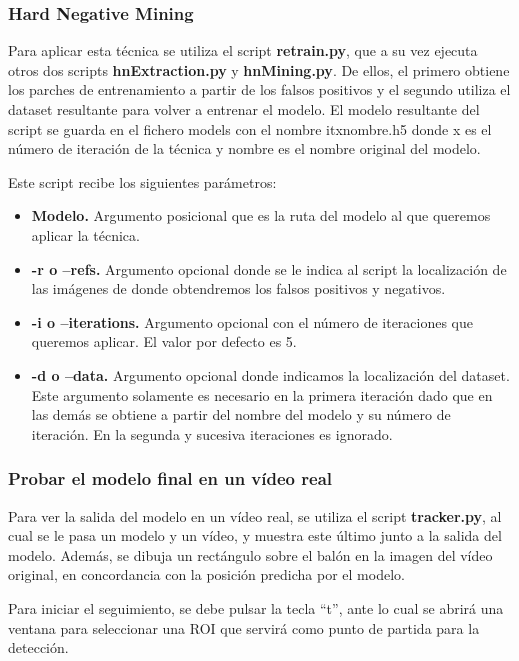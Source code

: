 \subsubsection*{Hard Negative Mining}

Para aplicar esta técnica se utiliza el script \textbf{retrain.py}, que a su vez ejecuta otros dos scripts \textbf{hnExtraction.py} y \textbf{hnMining.py}. De ellos, el primero obtiene los parches de entrenamiento a partir de los falsos positivos y el segundo utiliza el dataset resultante para volver a entrenar el modelo. El modelo resultante del script se guarda en el fichero models con el nombre itxnombre.h5 donde x es el número de iteración de la técnica y nombre es el nombre original del modelo.

Este script recibe los siguientes parámetros:

\begin{itemize}
  \item \textbf{Modelo.} Argumento posicional que es la ruta del modelo al que queremos aplicar la técnica.
  \item\textbf{-r o --refs.} Argumento opcional donde se le indica al script la localización de las imágenes de donde obtendremos los falsos positivos y negativos.
  \item \textbf{-i o --iterations.} Argumento opcional con el número de iteraciones que queremos aplicar. El valor por defecto es 5.
  \item \textbf{-d o --data.} Argumento opcional donde indicamos la localización del dataset. Este argumento solamente es necesario en la primera iteración dado que en las demás se obtiene a partir del nombre del modelo y su número de iteración. En la segunda y sucesiva iteraciones es ignorado.
\end{itemize}

\subsubsection*{Probar el modelo final en un vídeo real}

Para ver la salida del modelo en un vídeo real, se utiliza el script \textbf{tracker.py}, al cual se le pasa un modelo y un vídeo, y muestra este último junto a la salida del modelo. Además, se dibuja un rectángulo sobre el balón en la imagen del vídeo original, en concordancia con la posición predicha por el modelo.

Para iniciar el seguimiento, se debe pulsar la tecla ``t'', ante lo cual se abrirá una ventana para seleccionar una ROI que servirá como punto de partida para la detección.

\newpage